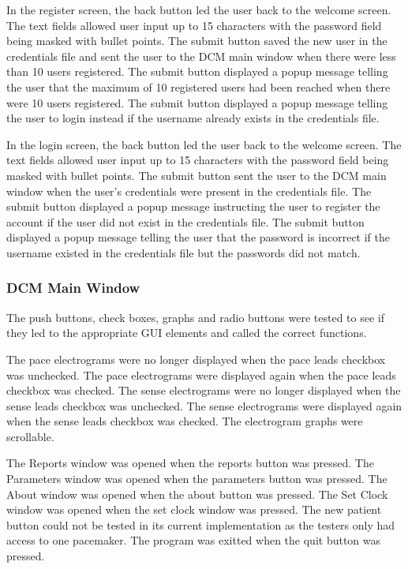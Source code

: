 \documentclass[12pt]{article}
\begin{document}
In the register screen, the back button led the user back to the welcome screen. The text fields allowed user input up to 15 characters with the password field being masked with bullet points. The submit button saved the new user in the credentials file and sent the user to the DCM main window when there were less than 10 users registered. The submit button displayed a popup message telling the user that the maximum of 10 registered users had been reached when there were 10 users registered. The submit button displayed a popup message telling the user to login instead if the username already exists in the credentials file.

In the login screen, the back button led the user back to the welcome screen. The text fields allowed user input up to 15 characters with the password field being masked with bullet points. The submit button sent the user to the DCM main window when the user's credentials were present in the credentials file. The submit button displayed a popup message instructing the user to register the account if the user did not exist in the credentials file. The submit button displayed a popup message telling the user that the password is incorrect if the username existed in the credentials file but the passwords did not match.

\subsubsection{DCM Main Window}\label{Testing:DCMMainWindow}
The push buttons, check boxes, graphs and radio buttons were tested to see if they led to the appropriate GUI elements and called the correct functions.

The pace electrograms were no longer displayed when the pace leads checkbox was unchecked. The pace electrograms were displayed again when the pace leads checkbox was checked. The sense electrograms were no longer displayed when the sense leads checkbox was unchecked. The sense electrograms were displayed again when the sense leads checkbox was checked. The electrogram graphs were scrollable.

The Reports window was opened when the reports button was pressed. The Parameters window was opened when the parameters button was pressed. The About window was opened when the about button was pressed. The Set Clock window was opened when the set clock window was pressed. The new patient button could not be tested in its current implementation as the testers only had access to one pacemaker. The program was exitted when the quit button was pressed.
\end{document}
